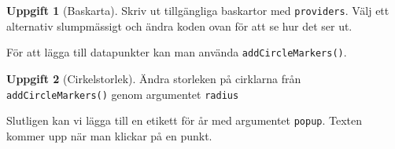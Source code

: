 \documentclass[
]{book}
\newenvironment{Shaded}{\begin{snugshade}}{\end{snugshade}}
\newcommand{\AttributeTok}[1]{\textcolor[rgb]{0.13,0.29,0.53}{#1}}
\newcommand{\DecValTok}[1]{\textcolor[rgb]{0.00,0.00,0.81}{#1}}
\newcommand{\FunctionTok}[1]{\textcolor[rgb]{0.13,0.29,0.53}{\textbf{#1}}}
\newcommand{\NormalTok}[1]{#1}
\newcommand{\SpecialCharTok}[1]{\textcolor[rgb]{0.81,0.36,0.00}{\textbf{#1}}}
\theoremstyle{definition}
\theoremstyle{definition}
\theoremstyle{definition}
\newtheorem{exercise}{Uppgift}[chapter]
\theoremstyle{definition}
\theoremstyle{remark}
\begin{document}
\begin{Shaded}
\end{Shaded}

\begin{exercise}[Baskarta]
Skriv ut tillgängliga baskartor med \texttt{providers}. Välj ett alternativ slumpmässigt och ändra koden ovan för att se hur det ser ut.
\end{exercise}

För att lägga till datapunkter kan man använda \texttt{addCircleMarkers()}.

\begin{Shaded}
\end{Shaded}

\begin{exercise}[Cirkelstorlek]
Ändra storleken på cirklarna från \texttt{addCircleMarkers()} genom argumentet \texttt{radius}
\end{exercise}

Slutligen kan vi lägga till en etikett för år med argumentet \texttt{popup}. Texten kommer upp när man klickar på en punkt.

\begin{Shaded}
\end{Shaded}
\end{document}
